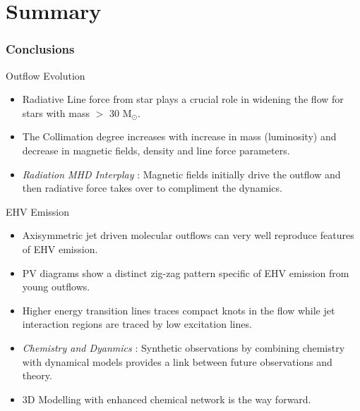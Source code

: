 \documentclass[8pt,xcolor=dvipsnames]{beamer}
\begin{document}
\section{Summary}
\begin{frame}[plain]
\frametitle{Conclusions}
\begin{block}{Outflow Evolution}
\begin{itemize}
\item Radiative Line force from star plays a crucial role in widening
  the flow for stars with mass $>$ 30 M$_{\odot}$.
\item The Collimation degree increases with increase in mass
  (luminosity) and decrease in magnetic fields, density and line force
  parameters.
\item \textit{Radiation MHD Interplay} :  Magnetic fields initially drive the outflow and then radiative
  force takes over to compliment the dynamics.
\end{itemize}
\end{block}
\begin{block}{EHV Emission}
\begin{itemize}
\item Axisymmetric jet driven molecular outflows can very well
  reproduce features of EHV emission.
\item PV diagrams show a distinct zig-zag pattern specific of EHV
  emission from young outflows.
\item Higher energy transition lines traces compact knots in the flow
  while jet interaction regions are traced by low excitation lines.
\item \textit{Chemistry and Dyanmics} : Synthetic observations by
  combining chemistry with dynamical models provides a link between
  future observations and theory. 
\item 3D Modelling with enhanced chemical network is the way forward.
\end{itemize}
\end{block}
\end{frame}
\end{document}
